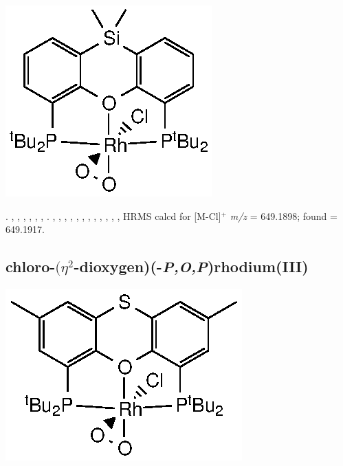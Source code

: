 \begin{structure}[h]
\begin{center}
\includegraphics{../Structures/SitBuRhClO2.eps}
\end{center}
\end{structure}



.
,
,
,
,
,
,
.
,
,
,
,
,
,
,
,
,
,
,
,
HRMS calcd for  [M-Cl]$^+$ \emph{m/z} = 649.1898; found = 649.1917.


\subsection*{chloro-$(\eta^2$-dioxygen)(\tButhixantphosk-\emph{P,O,P})rhodium(III)}

\begin{structure}[h]
\begin{center}
\includegraphics{../Structures/StBuRhClO2.eps}
\end{center}
\end{structure}



